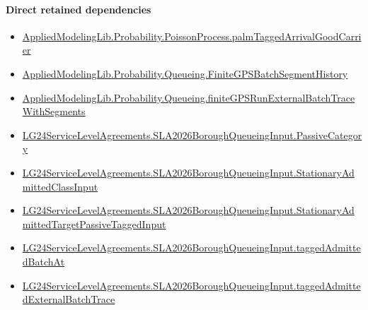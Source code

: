 \documentclass[10pt]{article}
\begin{document}
\paragraph{Direct retained dependencies}
\begin{itemize}\raggedright
\item \hyperlink{governing-declaration-ae13476c571ece6d}{Applied\allowbreak{}Modeling\allowbreak{}Lib.\allowbreak{}Probability.\allowbreak{}Poisson\allowbreak{}Process.\allowbreak{}palm\allowbreak{}Tagged\allowbreak{}Arrival\allowbreak{}Good\allowbreak{}Carrier}
\item \hyperlink{governing-declaration-3746e7ce0902fe7e}{Applied\allowbreak{}Modeling\allowbreak{}Lib.\allowbreak{}Probability.\allowbreak{}Queueing.\allowbreak{}Finite\allowbreak{}GPS\allowbreak{}Batch\allowbreak{}Segment\allowbreak{}History}
\item \hyperlink{governing-declaration-8aed6a975b8ae52f}{Applied\allowbreak{}Modeling\allowbreak{}Lib.\allowbreak{}Probability.\allowbreak{}Queueing.\allowbreak{}finite\allowbreak{}GPS\allowbreak{}Run\allowbreak{}External\allowbreak{}Batch\allowbreak{}Trace\allowbreak{}With\allowbreak{}Segments}
\item \hyperlink{governing-declaration-abc91e26948cf0a3}{LG24\allowbreak{}Service\allowbreak{}Level\allowbreak{}Agreements.\allowbreak{}SLA2026\allowbreak{}Borough\allowbreak{}Queueing\allowbreak{}Input.\allowbreak{}Passive\allowbreak{}Category}
\item \hyperlink{governing-declaration-f3072ff54a3653c2}{LG24\allowbreak{}Service\allowbreak{}Level\allowbreak{}Agreements.\allowbreak{}SLA2026\allowbreak{}Borough\allowbreak{}Queueing\allowbreak{}Input.\allowbreak{}Stationary\allowbreak{}Admitted\allowbreak{}Class\allowbreak{}Input}
\item \hyperlink{governing-declaration-8796a25a610eaea9}{LG24\allowbreak{}Service\allowbreak{}Level\allowbreak{}Agreements.\allowbreak{}SLA2026\allowbreak{}Borough\allowbreak{}Queueing\allowbreak{}Input.\allowbreak{}Stationary\allowbreak{}Admitted\allowbreak{}Target\allowbreak{}Passive\allowbreak{}Tagged\allowbreak{}Input}
\item \hyperlink{governing-declaration-802a7f71e8b46c56}{LG24\allowbreak{}Service\allowbreak{}Level\allowbreak{}Agreements.\allowbreak{}SLA2026\allowbreak{}Borough\allowbreak{}Queueing\allowbreak{}Input.\allowbreak{}tagged\allowbreak{}Admitted\allowbreak{}Batch\allowbreak{}At}
\item \hyperlink{governing-declaration-db5021683b0ac329}{LG24\allowbreak{}Service\allowbreak{}Level\allowbreak{}Agreements.\allowbreak{}SLA2026\allowbreak{}Borough\allowbreak{}Queueing\allowbreak{}Input.\allowbreak{}tagged\allowbreak{}Admitted\allowbreak{}External\allowbreak{}Batch\allowbreak{}Trace}
\end{itemize}
\hypertarget{governing-declaration-89953ee3c5f329cc}{}
\end{document}
